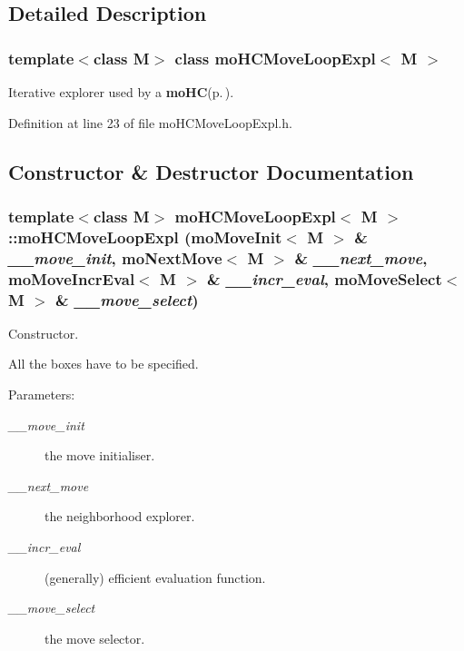 \subsection{Detailed Description}
\subsubsection*{template$<$class M$>$ class mo\-HCMove\-Loop\-Expl$<$ M $>$}

Iterative explorer used by a {\bf mo\-HC}{\rm (p.\,\pageref{classmo_h_c})}. 



Definition at line 23 of file mo\-HCMove\-Loop\-Expl.h.

\subsection{Constructor \& Destructor Documentation}
\subsubsection{\setlength{\rightskip}{0pt plus 5cm}template$<$class M$>$ {\bf mo\-HCMove\-Loop\-Expl}$<$ M $>$::{\bf mo\-HCMove\-Loop\-Expl} ({\bf mo\-Move\-Init}$<$ M $>$ \& {\em \_\-\_\-move\_\-init}, {\bf mo\-Next\-Move}$<$ M $>$ \& {\em \_\-\_\-next\_\-move}, {\bf mo\-Move\-Incr\-Eval}$<$ M $>$ \& {\em \_\-\_\-incr\_\-eval}, {\bf mo\-Move\-Select}$<$ M $>$ \& {\em \_\-\_\-move\_\-select})\hspace{0.3cm}{\tt  [inline]}}\label{classmo_h_c_move_loop_expl_11410d648d79746253e9dc249c4ec7b5}


Constructor. 

All the boxes have to be specified.

\begin{Desc}
\item[Parameters:]
\begin{description}
\item[{\em \_\-\_\-move\_\-init}]the move initialiser. \item[{\em \_\-\_\-next\_\-move}]the neighborhood explorer. \item[{\em \_\-\_\-incr\_\-eval}](generally) efficient evaluation function. \item[{\em \_\-\_\-move\_\-select}]the move selector. \end{description}
\end{Desc}


